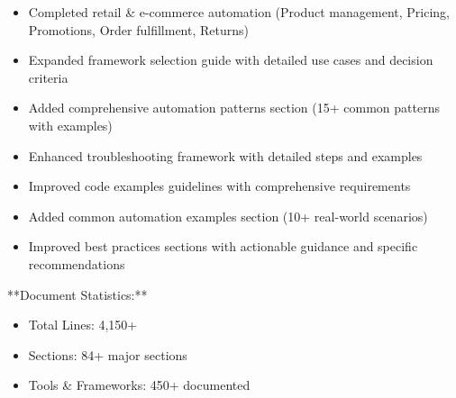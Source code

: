 \documentclass[11pt,a4paper]{article}
\begin{document}
\begin{itemize}
\item Completed retail & e-commerce automation (Product management, Pricing, Promotions, Order fulfillment, Returns)
\end{itemize}

\begin{itemize}
\item Expanded framework selection guide with detailed use cases and decision criteria
\end{itemize}

\begin{itemize}
\item Added comprehensive automation patterns section (15+ common patterns with examples)
\end{itemize}

\begin{itemize}
\item Enhanced troubleshooting framework with detailed steps and examples
\end{itemize}

\begin{itemize}
\item Improved code examples guidelines with comprehensive requirements
\end{itemize}

\begin{itemize}
\item Added common automation examples section (10+ real-world scenarios)
\end{itemize}

\begin{itemize}
\item Improved best practices sections with actionable guidance and specific recommendations
\end{itemize}

**Document Statistics:**

\begin{itemize}
\item Total Lines: 4,150+
\end{itemize}

\begin{itemize}
\item Sections: 84+ major sections
\end{itemize}

\begin{itemize}
\item Tools & Frameworks: 450+ documented
\end{itemize}
\end{document}
